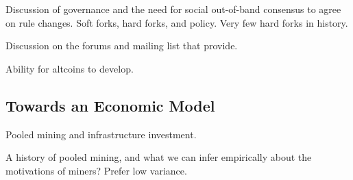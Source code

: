 Discussion of governance and the need for social out-of-band consensus to agree on rule changes. Soft forks, hard forks, and policy. Very few hard forks in history.

Discussion on the forums and mailing list that provide.

Ability for altcoins to develop.

\subsection{Towards an Economic Model}

Pooled mining and infrastructure investment.

A history of pooled mining, and what we can infer empirically about the motivations of miners? Prefer low variance.
